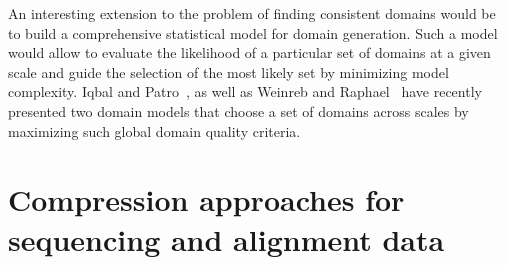 \documentclass[12pt]{cmuthesis}
\begin{document}

  An interesting extension to the problem of finding consistent domains would be to build a comprehensive statistical model for domain generation. Such a model would allow to evaluate the likelihood of a particular set of domains at a given scale and guide the selection of the most likely set by minimizing model complexity. Iqbal and Patro~\cite{IqbalDomains}, as well as Weinreb and Raphael~\cite{WeinrebDomains} have recently presented two domain models that choose a set of domains across scales by maximizing such global domain quality criteria.



\part{Compression approaches for sequencing and alignment data}
\label{part:compress}


%
%





\end{document}
